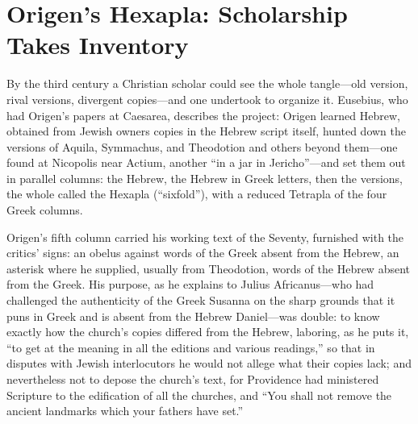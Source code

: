 \section{Origen's Hexapla: Scholarship Takes Inventory}

By the third century a Christian scholar could see the whole tangle---old
version, rival versions, divergent copies---and one undertook to organize
it. Eusebius, who had Origen's papers at Caesarea, describes the project:
Origen learned Hebrew, obtained from Jewish owners copies in the Hebrew
script itself, hunted down the versions of Aquila, Symmachus, and Theodotion
and others beyond them---one found at Nicopolis near Actium, another ``in a
jar in Jericho''---and set them out in parallel columns: the Hebrew, the
Hebrew in Greek letters, then the versions, the whole called the Hexapla
(``sixfold''), with a reduced Tetrapla of the four Greek
columns.

Origen's fifth column carried his working text of the Seventy, furnished
with the critics' signs: an obelus against words of the Greek absent from
the Hebrew, an asterisk where he supplied, usually from Theodotion, words
of the Hebrew absent from the Greek. His purpose, as he explains to Julius
Africanus---who had challenged the authenticity of the Greek Susanna on
the sharp grounds that it puns in Greek and is absent from the Hebrew
Daniel---was double: to know exactly how the church's copies differed from
the Hebrew, laboring, as he puts it, ``to get at the meaning in all the
editions and various readings,'' so that in disputes with Jewish
interlocutors he would not allege what their copies lack; and nevertheless
not to depose the church's text, for Providence had ministered Scripture
to the edification of all the churches, and ``You shall not remove the
ancient landmarks which your fathers have
set.''

